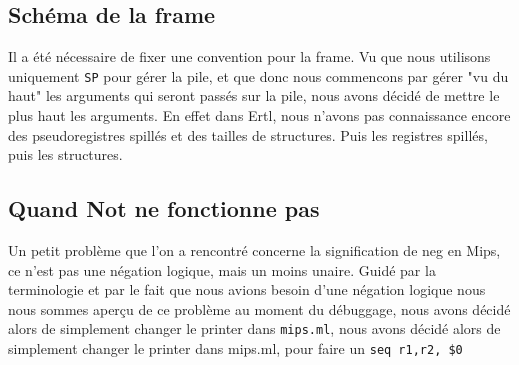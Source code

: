 \documentclass[a4paper]{article}
\begin{document}
\subsection{Schéma de la frame}

Il a été nécessaire de fixer une convention pour la frame. Vu que nous
utilisons uniquement \texttt{SP} pour gérer la pile, 
et que donc nous commencons par gérer "vu du haut"
les arguments qui seront passés sur la pile, nous avons décidé de mettre
le plus haut les arguments. En effet dans Ertl, nous n'avons pas
connaissance encore des pseudoregistres spillés et des tailles de
structures. Puis les registres spillés, puis les structures.

\subsection{Quand Not ne fonctionne pas}
Un petit problème que l'on a rencontré concerne la signification de neg
en Mips, ce n'est pas une négation logique, mais un moins unaire. Guidé
par la terminologie et par le fait que nous avions besoin d'une négation
logique nous nous sommes aperçu de ce problème au moment du débuggage,
nous avons décidé alors de simplement changer le printer dans \texttt{mips.ml},
nous avons décidé alors de simplement changer le printer dans mips.ml,
pour faire un \texttt{seq r1,r2, \$0}
\end{document}
